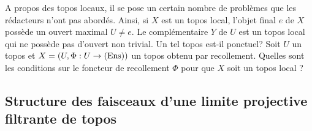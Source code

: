 \documentclass[10pt]{../fichiers-configuration-latex/smfart}
\begin{document}
\subsubsection{}

A propos des topos locaux, il se pose un certain nombre de problèmes
que les rédacteurs n'ont pas abordés. Ainsi, si $X$ est un topos
local, l'objet final $e$ de $X$ possède un ouvert maximal $U \neq
e$. Le complémentaire $Y$ de $U$ est un topos local qui ne possède
pas d'ouvert non trivial. Un tel topos est-il ponctuel? Soit $U$ un
topos et $X = (U, \Phi : U \to (\Ens))$ un topos obtenu par
recollement. Quelles sont les conditions sur le foncteur de
recollement $\Phi$ pour que $X$ soit un topos local ?

\subsection{Structure des faisceaux d'une limite projective filtrante
  de topos}

\subsubsection{}
\end{document}
